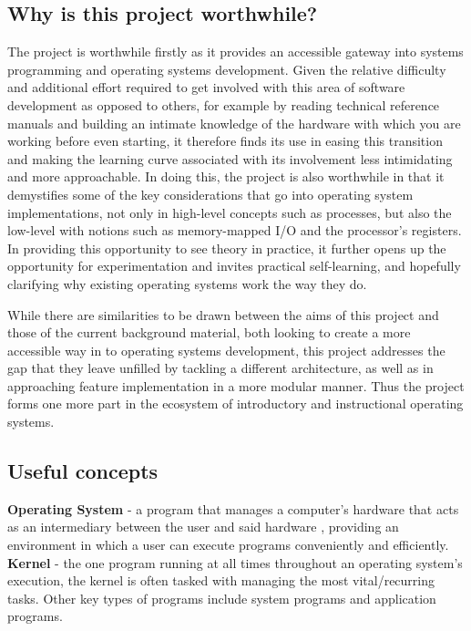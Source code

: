 \subsection{Why is this project worthwhile?}
    The project is worthwhile firstly as it provides an accessible gateway into
    systems programming and operating systems development. Given the relative
    difficulty and additional effort required to get involved with this area of
    software development as opposed to others, for example by reading technical
    reference manuals and building an intimate knowledge of the hardware with
    which you are working before even starting, it therefore finds its use in
    easing this transition and making the learning curve associated with its
    involvement less intimidating and more approachable. In doing this, the
    project is also worthwhile in that it demystifies some of the key
    considerations that go into operating system implementations, not only in
    high-level concepts such as processes, but also the low-level with notions
    such as memory-mapped I/O and the processor's registers. In providing this
    opportunity to see theory in practice, it further opens up the opportunity
    for experimentation and invites practical self-learning, and hopefully
    clarifying why existing operating systems work the way they do.

    While there are similarities to be drawn between the aims of this project
    and those of the current background material, both looking to create a more
    accessible way in to operating systems development, this project addresses
    the gap that they leave unfilled by tackling a different architecture, as
    well as in approaching feature implementation in a more modular manner. Thus
    the project forms one more part in the ecosystem of introductory and
    instructional operating systems.

\subsection{Useful concepts}
    \noindent \textbf{Operating System} - a program that manages a computer's hardware
    that acts as an intermediary between the user and said hardware
    \cite{DinosaurOS}, providing an environment in which a user can execute
    programs conveniently and efficiently. \\

    \noindent \textbf{Kernel} - the one program running at all times throughout
    an operating system's execution, the kernel is often tasked with managing
    the most vital/recurring tasks. Other key types of programs include system
    programs and application programs. \\

